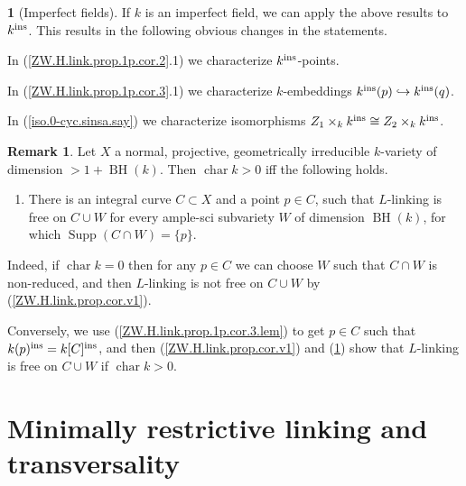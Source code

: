 \documentclass{amsart}
\theoremstyle{definition}
\newtheorem{say}[thm]{}
\newtheorem{rem}[thm]{Remark}
\theoremstyle{remark}
\newcommand{\supp}[0]{\operatorname{Supp}}
\newcommand{\chr}[0]{\operatorname{char}}
\def\into{\DOTSB\lhook\joinrel\to}
\newcommand{\BH}[0]{\operatorname{BH}}
\begin{document}
\begin{say}[Imperfect fields] \label{ZW.H.link.prop.cor.v1.imp}
If $k$ is an imperfect field, we can apply the above results to $k^{\rm ins}$. This results in the following obvious changes in the statements.


In (\ref{ZW.H.link.prop.1p.cor.2}.1) we characterize  $k^{\rm ins}$-points.


In (\ref{ZW.H.link.prop.1p.cor.3}.1) we characterize  $k$-embeddings $k^{\rm ins}(p)\into k^{\rm ins}(q)$.

In (\ref{iso.0-cyc.sinsa.say}) we characterize isomorphisms
$Z_1\times_kk^{\rm ins}\cong Z_2\times_kk^{\rm ins}$.
\end{say}



\begin{rem} \label{char.p.or.not.rem}
Let  $X$  a  normal, projective, geometrically irreducible  $k$-variety of dimension $>1+\BH(k)$.  Then $\chr k>0$ iff the following holds.
\begin{enumerate}
\item 
There is an integral  curve   $C\subset X$ and a point $p\in C$,  
 such that   $L$-linking is free on $C\cup W$ 
for every ample-sci subvariety $W$ of dimension $\BH(k)$, 
for which  $\supp(C\cap W)=\{p\}$. 
\end{enumerate}
Indeed, if $\chr k=0$ then for any $p\in C$ we can choose $W$ such that
$C\cap W$ is non-reduced, and then  $L$-linking is not free on $C\cup W$
by (\ref{ZW.H.link.prop.cor.v1}).

Conversely, we use (\ref{ZW.H.link.prop.1p.cor.3.lem}) to get
$p\in C$ such that $k(p)^{\rm ins}=k[C]^{\rm ins}$, and then (\ref{ZW.H.link.prop.cor.v1}) and (\ref{ZW.H.link.prop.cor.v1.imp})
show that $L$-linking is  free on $C\cup W$
if $\chr k>0$. 
\end{rem}




\section{Minimally restrictive linking and transversality}\label{min.rest.tra.sect}
\end{document}
